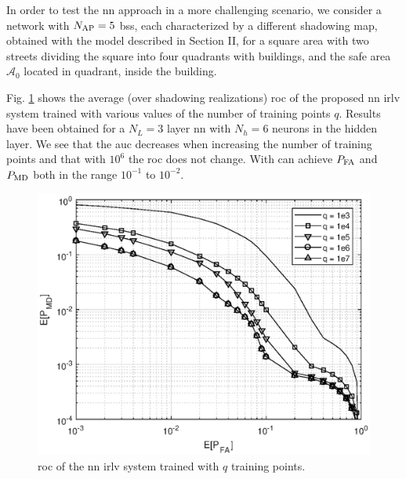 \documentclass[conference]{IEEEtran}
\begin{document}
 
In order to test the \ac{nn} approach in a more challenging scenario, we consider a network with $N_{\rm AP}=5$ \acp{bs}, each  characterized by a different  shadowing map, obtained with the model described in Section II, for a square area with two streets dividing the square into four quadrants with buildings, and the safe area $\mathcal A_0$  located in quadrant, inside the building.




Fig. \ref{fig:n_train} shows the average (over shadowing realizations) \ac{roc} of the proposed \ac{nn} \ac{irlv} system  trained with various values of the number of training points $q$. Results have been obtained for a $N_L=3$ layer \ac{nn} with $N_h=6$ neurons in the hidden layer. We see that the \ac{auc} decreases when increasing the number of training points and that with $10^6$ the \ac{roc} does not change. With can achieve $P_{\rm FA}$ and $P_{\rm MD}$ both in the range $10^{-1}$ to $10^{-2}$.

\begin{figure}[t]
    \centering
    \includegraphics[width=0.9\columnwidth]{mean_maps.eps}
    \caption{\ac{roc} of the \ac{nn} \ac{irlv} system trained with $q$ training points.}
    \label{fig:n_train}
\end{figure}
\end{document}
